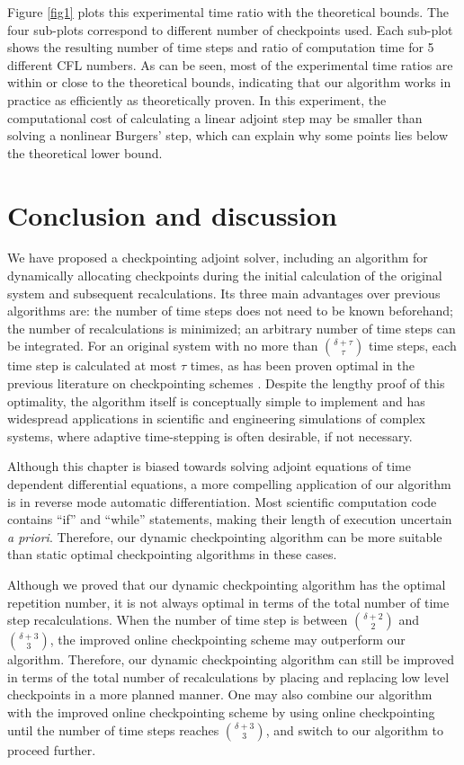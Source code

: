 Figure \ref{fig1} plots this experimental time ratio with the theoretical
bounds.  The four sub-plots correspond to different number of checkpoints used.
Each sub-plot shows the resulting number of time steps and ratio of computation
time for 5 different CFL numbers.  As can be seen, most of the experimental time
ratios are within or close to the theoretical bounds, indicating that our
algorithm works in practice as efficiently as theoretically proven.  In this
experiment, the computational cost of calculating a linear adjoint step may be
smaller than solving a nonlinear Burgers' step, which can explain why some
points lies below the theoretical lower bound.





\section{Conclusion and discussion \label{sec_conc}}

We have proposed a checkpointing adjoint solver, including an algorithm for
dynamically allocating checkpoints during the initial calculation of the
original system and subsequent recalculations.  Its three main advantages
over previous algorithms are: the number of time steps does not need to be
known beforehand; the number of recalculations is minimized; an arbitrary
number of time steps can be integrated.  For an original system with no more
than $\binom{\delta + \tau}{\tau}$ time steps, each time step is calculated
at most $\tau$ times, as has been proven optimal in the previous literature on
checkpointing schemes \cite[]{griewank92}.  Despite the lengthy proof of this
optimality, the algorithm itself is conceptually simple to implement and has
widespread applications in scientific and engineering simulations of complex
systems, where adaptive time-stepping is often desirable, if not necessary.

Although this chapter is biased towards solving adjoint equations of time
dependent differential equations, a more compelling application of our
algorithm is in reverse mode automatic differentiation.  Most scientific
computation code contains ``if'' and ``while'' statements, making
their length of execution uncertain {\it a priori}.  Therefore, our dynamic
checkpointing algorithm can be more suitable than static optimal checkpointing
algorithms in these cases.

Although we proved that our dynamic checkpointing algorithm has the optimal
repetition number, it is not always optimal in terms of the total number
of time step recalculations.  When the number of time step is between
$\binom{\delta + 2}{2}$ and $\binom{\delta + 3}{3}$, the improved online
checkpointing scheme \cite[]{andrea08} may outperform our algorithm.  Therefore,
our dynamic checkpointing algorithm can still be improved in terms of the total
number of recalculations by placing and replacing low level checkpoints in a
more planned manner.  One may also combine our algorithm with the improved
online checkpointing scheme by using online checkpointing until the number
of time steps reaches $\binom{\delta + 3}{3}$, and switch to our algorithm
to proceed further.

